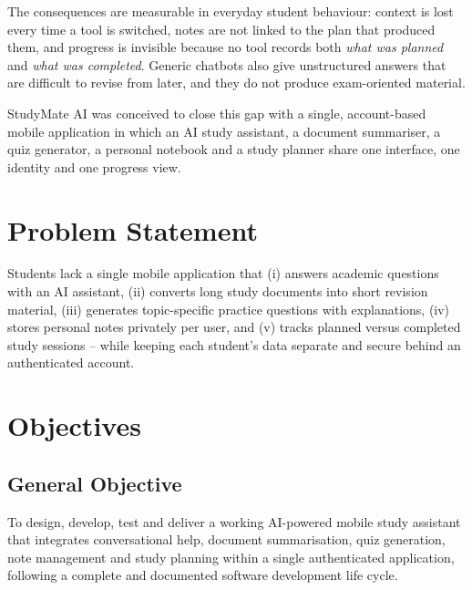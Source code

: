 \documentclass[12pt,a4paper,oneside]{report}
\begin{document}
The consequences are measurable in everyday student behaviour: context is lost every
time a tool is switched, notes are not linked to the plan that produced them, and
progress is invisible because no tool records both \emph{what was planned} and
\emph{what was completed}. Generic chatbots also give unstructured answers that are
difficult to revise from later, and they do not produce exam-oriented material.

StudyMate AI was conceived to close this gap with a single, account-based mobile
application in which an AI study assistant, a document summariser, a quiz generator,
a personal notebook and a study planner share one interface, one identity and one
progress view.

\section{Problem Statement}

Students lack a single mobile application that (i) answers academic questions with
an AI assistant, (ii) converts long study documents into short revision material,
(iii) generates topic-specific practice questions with explanations, (iv) stores
personal notes privately per user, and (v) tracks planned versus completed study
sessions -- while keeping each student's data separate and secure behind an
authenticated account.

\section{Objectives}

\subsection{General Objective}
To design, develop, test and deliver a working AI-powered mobile study assistant
that integrates conversational help, document summarisation, quiz generation, note
management and study planning within a single authenticated application, following a
complete and documented software development life cycle.
\end{document}
